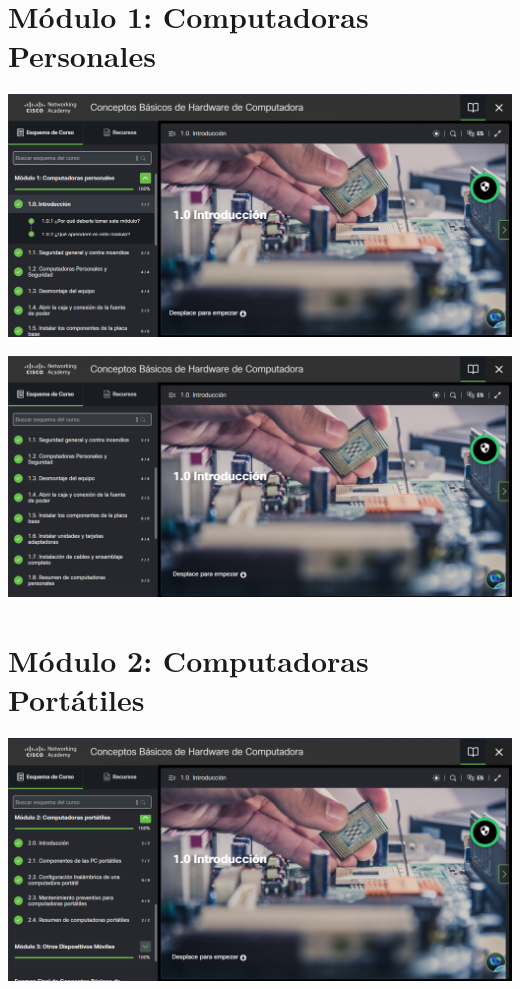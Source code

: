 \documentclass{article}
\begin{document}
\section{Módulo 1: Computadoras Personales}
\label{sec:org1fca212}

\begin{center}
\includegraphics[width=.9\linewidth]{./images/modulo1.png}
\end{center}
\begin{center}
\includegraphics[width=.9\linewidth]{./images/modulo1_1.png}
\end{center}

\section{Módulo 2: Computadoras Portátiles}
\label{sec:org683a01b}

\begin{center}
\includegraphics[width=.9\linewidth]{./images/modulo2.png}
\end{center}
\end{document}

